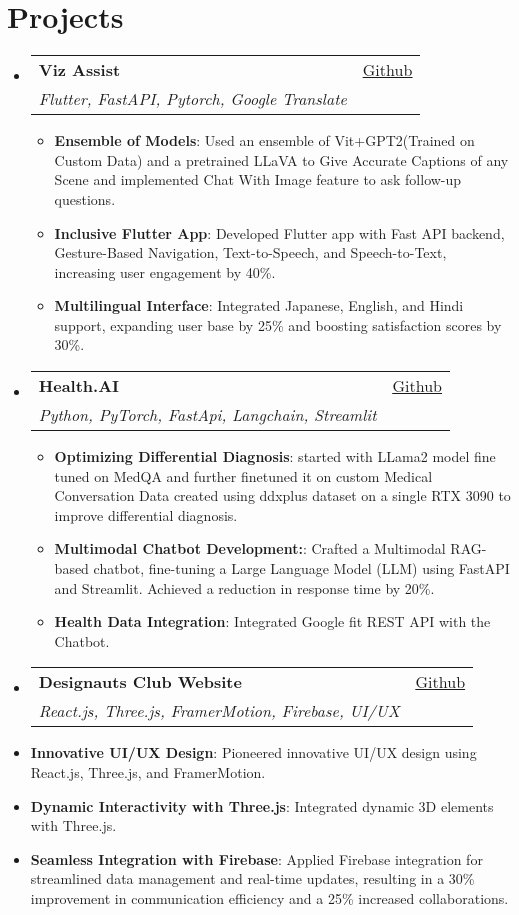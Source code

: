 \documentclass[letterpaper,11pt]{article}
\makeatletter
\newcommand{\resumeItem}[2]{
  \item\small{
    \textbf{#1}{: #2 \vspace{-2pt}}
  }
}
\newcommand{\resumeSubheading}[4]{
  \vspace{-1pt}\item
    \begin{tabular*}{0.97\textwidth}{l@{\extracolsep{\fill}}r}
      \textbf{#1} & #2 \\
      \textit{\small#3} & \textit{\small #4} \\
    \end{tabular*}\vspace{-5pt}
}
\newcommand{\resumeSubHeadingListStart}{\begin{itemize}[leftmargin=*]}
\newcommand{\resumeItemListStart}{\begin{itemize}}
\newcommand{\resumeItemListEnd}{\end{itemize}\vspace{-5pt}}
\makeatother
\begin{document}
\section{Projects}
  \resumeSubHeadingListStart
    \resumeSubheading
    {Viz Assist}
    {\href{https://github.com/vivek005001/viz_assist}{\uline{Github}}}
    {Flutter, FastAPI, Pytorch, Google Translate}{}
    
        \resumeItemListStart
            \resumeItem{Ensemble of Models}
              {Used an ensemble of Vit+GPT2(Trained on Custom Data) and a pretrained LLaVA to Give Accurate Captions of any Scene and implemented Chat With Image feature to ask follow-up questions.}
            \resumeItem{Inclusive Flutter App}
               {Developed Flutter app with Fast API backend, Gesture-Based Navigation, Text-to-Speech, and Speech-to-Text, increasing user engagement by 40\%.}
            \resumeItem{Multilingual Interface}
              {Integrated Japanese, English, and Hindi support, expanding user base by 25\% and boosting satisfaction scores by 30\%.}
        \resumeItemListEnd

\resumeSubheading
    {Health.AI}
    {\href{https://github.com/vivek005001}
    {\uline{Github}}}
    {Python, PyTorch, FastApi, Langchain, Streamlit}{}

    \resumeItemListStart
        \resumeItem{Optimizing Differential Diagnosis}
            {started with LLama2 model fine tuned  on MedQA and further finetuned it on
custom Medical Conversation Data  created using ddxplus dataset on a single RTX 3090 to improve differential diagnosis.}
        \resumeItem{Multimodal Chatbot Development:}
             {Crafted a Multimodal RAG-based chatbot, fine-tuning a Large Language Model (LLM) using FastAPI and Streamlit. Achieved a reduction in response time by 20\%.}
        \resumeItem{Health Data Integration}
             {Integrated Google fit REST API with the Chatbot.}
        
    \resumeItemListEnd

\resumeSubheading
    {Designauts Club Website}
    {\href{https://github.com/vivek005001/Designauts_Website}
    {\uline{Github}}}
    {React.js, Three.js, FramerMotion, Firebase, UI/UX}

    
    \resumeItemListStart
        \resumeItem{Innovative UI/UX Design}
            {Pioneered innovative UI/UX design using React.js, Three.js, and FramerMotion.}
        \resumeItem{Dynamic Interactivity with Three.js}
              {Integrated dynamic 3D elements with Three.js.}
        \resumeItem{Seamless Integration with Firebase}
              {Applied Firebase integration for streamlined data management and real-time updates, resulting in a 30\% improvement in communication efficiency and a 25\% increased collaborations.}
    \resumeItemListEnd
\end{document}
